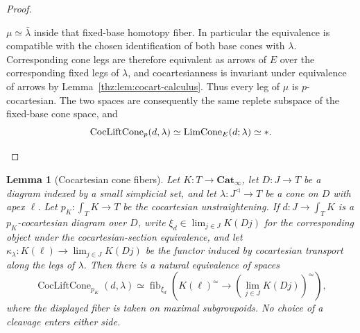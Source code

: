 \documentclass[oneside]{article}
\theoremstyle{plain}
\newtheorem{lemma}[theorem]{Lemma}
\theoremstyle{definition}
\theoremstyle{remark}
\newcommand{\Cat}{\mathbf{Cat}_{\infty}}
\newcommand{\fib}{\operatorname{fib}}
\begin{document}
\begin{proof}
\begin{enumerate}
$\mu\simeq\bar\lambda$ inside that fixed-base homotopy fiber.  In particular
the equivalence is compatible with the chosen identification of both base
cones with $\lambda$.  Corresponding cone legs are therefore equivalent as
arrows of $E$ over the corresponding fixed legs of $\lambda$, and
cocartesianness is invariant under equivalence of arrows by
Lemma~\ref{thz:lem:cocart-calculus}.  Thus every leg of $\mu$ is
$p$-cocartesian.  The two spaces are consequently the same replete subspace
of the fixed-base cone space, and
\[
 \operatorname{CocLiftCone}_p(d,\lambda)
 \simeq \operatorname{LimCone}_E(d;\lambda)
 \simeq *.
\qedhere
\]
\end{enumerate}
\end{proof}

\begin{lemma}[Cocartesian cone fibers]\label{thz:lem:cocart-cone-fiber}
Let $K:T\to\Cat$, let $D:J\to T$ be a diagram indexed by a small
simplicial set, and let $\lambda:J^{\triangleleft}\longrightarrow T$ be a cone on $D$ with apex $\ell$.  Let
$p_K:\int_TK\to T$ be the cocartesian unstraightening.  If
$d:J\to\int_TK$ is a $p_K$-cocartesian diagram over $D$, write $\xi_d\in\lim_{j\in J}K(Dj)$ for the corresponding object under the cocartesian-section equivalence, and
let $\kappa_\lambda:K(\ell)\longrightarrow\lim_{j\in J}K(Dj)$ be the functor induced by cocartesian transport along the legs of $\lambda$.
Then there is a natural equivalence of spaces
\begin{equation}\label{thz:eq:cocart-cone-fiber}
 \operatorname{CocLiftCone}_{p_K}(d,\lambda)
 \simeq
 \fib_{\xi_d}\!\left(
   K(\ell)^{\simeq}
   \longrightarrow
   \left(\lim_{j\in J}K(Dj)\right)^{\simeq}
 \right),
\end{equation}
where the displayed fiber is taken on maximal subgroupoids.  No choice of a
cleavage enters either side.
\end{lemma}
\end{document}
